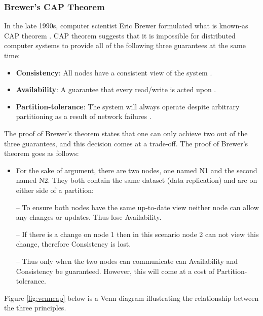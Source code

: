\subsubsection{Brewer's CAP Theorem}\label{cap}
In the late 1990s, computer scientist Eric Brewer formulated what is known-as CAP theorem \cite{toad}. CAP theorem suggests that it is impossible for distributed computer systems to provide all of the following three guarantees at the same time:
\begin{itemize}
\item \textbf{Consistency}: All nodes have a consistent view of the system \cite{toad}.
\item \textbf{Availability}: A guarantee that every read/write is acted upon \cite{toad}.
\item \textbf{Partition-tolerance}: The system will always operate despite arbitrary partitioning as a result of network failures \cite{toad}.
\end{itemize}
The proof of Brewer's theorem states that one can only achieve two out of the three guarantees, and this decision comes at a trade-off. The proof of Brewer's theorem goes as follows:
\begin{itemize}[leftmargin=*]
\item For the sake of argument, there are two nodes, one named N1 and the second named N2. They both contain the same dataset (data replication) and are on either side of a partition:
\end{itemize}
\begin{itemize}
\item[--] To ensure both nodes have the same up-to-date view neither node can allow any changes or updates. Thus lose Availability.
\item[--] If there is a change on node 1 then in this scenario node 2 can not view this change, therefore Consistency is lost.
\item[--] Thus only when the two nodes can communicate can Availability and Consistency be guaranteed. However, this will come at a cost of Partition-tolerance.
\end{itemize}
Figure \ref{fig:venncap} below is a Venn diagram illustrating the relationship between the three principles.
